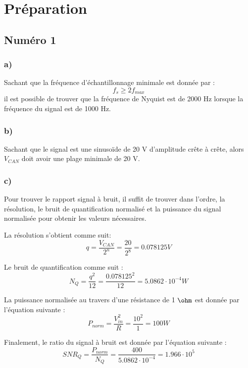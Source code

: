 
\chapter{Préparation}
\section*{Numéro 1}
\subsection*{a)}
Sachant que la fréquence d'échantillonnage minimale est donnée par :
\begin{equation}
	f_s \geq 2f_{max}
\end{equation}
il est possible de trouver que la fréquence de Nyquist est de 2000 Hz lorsque la fréquence du signal est de 1000 Hz.
\subsection*{b)}
Sachant que le signal est une sinusoïde de 20 V d'amplitude crête à crête, alors $V_{CAN}$ doit avoir une plage minimale de 20 V.
\subsection*{c)}
Pour trouver le rapport signal à bruit, il suffit de trouver dans l'ordre, la résolution, le bruit de quantification normalisé et la puissance du signal normalisée pour obtenir les valeurs nécessaires.

La résolution s'obtient comme suit:
\begin{equation}
	q = \frac{V_{CAN}}{2^n} = \frac{20}{2^8} = 0.078125 V
\end{equation}

Le bruit de quantification comme suit :
\begin{equation}
	N_Q = \frac{q^2}{12} = \frac{0.078125^2}{12} = 5.0862 \cdot 10^{-4} W
\end{equation}

La puissance normalisée au travers d'une résistance de 1 $\ohm$ est donnée par l'équation suivante :
\begin{equation}
	P_{norm} = \frac{V_{in}^2}{R} = \frac{10^2}{1} = 100 W
\end{equation}

Finalement, le ratio du signal à bruit est donnée par l'équation suivante :
\begin{equation}
	SNR_Q = \frac{P_{norm}}{N_Q} = \frac{400}{5.0862 \cdot 10^{-4}} = 1.966 \cdot 10^5
\end{equation}

